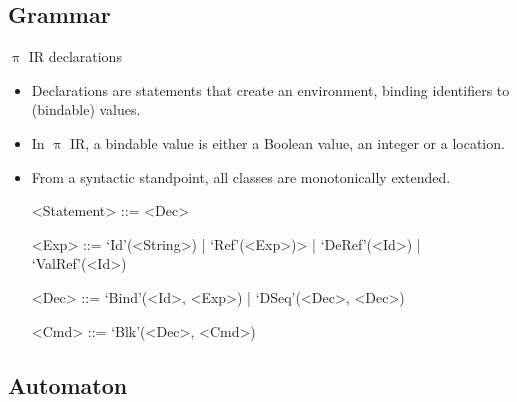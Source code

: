 \documentclass{beamer}
\begin{document}
\subsection{Grammar}


\begin{frame}{{\color{red}$\uppi$ IR} declarations}

\begin{itemize}
\item Declarations are statements that create an environment, binding identifiers to (bindable) values.
\item In {\color{red}$\uppi$ IR}, a bindable value is either a Boolean value, an integer or a location.
\item From a syntactic standpoint, all classes are monotonically extended.
\begin{grammar}
<Statement> ::= <Dec> 

<Exp>       ::=  `Id'(<String>)  | `Ref'(<Exp>)> | `DeRef'(<Id>) | `ValRef'(<Id>)

<Dec>       ::= `Bind'(<Id>, <Exp>) | `DSeq'(<Dec>, <Dec>)

<Cmd>      ::= `Blk'(<Dec>, <Cmd>) 
\end{grammar}
\end{itemize}

\end{frame}

\subsection{Automaton}

\end{document}
